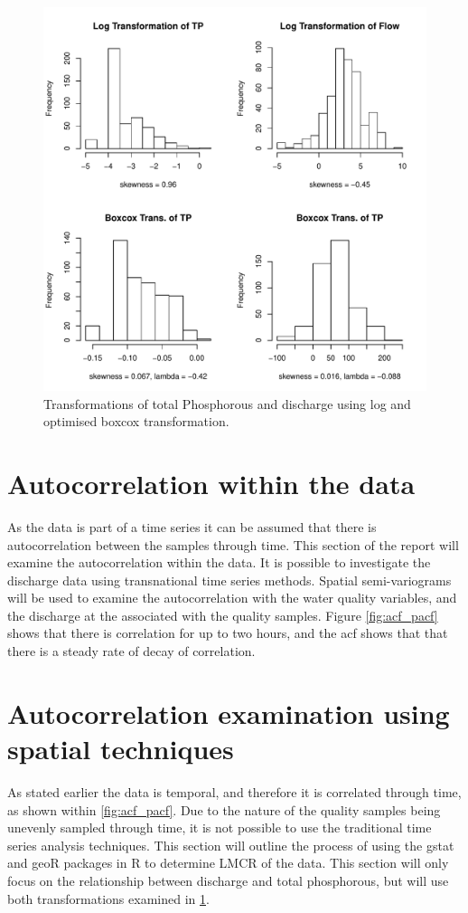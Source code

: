 \documentclass[5p]{elsarticle}
\begin{document}
\begin{center}
\begin{figure}
\includegraphics[scale=0.45]{tp_flow_trans.pdf}
\caption{Transformations of total Phosphorous and discharge using log and optimised boxcox transformation.}
\label{fig:transformations}
\end{figure}
\end{center}

\section*{Autocorrelation within the data}
As the data is part of a time series it can be assumed that there is autocorrelation between the samples through time. This section of the report will examine the autocorrelation within the data. It is possible to investigate the discharge data using transnational time series methods. Spatial semi-variograms will be used to examine the autocorrelation with the water quality variables, and the discharge at the associated with the quality samples. Figure \ref{fig:acf_pacf} shows that there is correlation for up to two hours, and the acf shows that that there is a steady rate of decay of correlation. 

\section*{Autocorrelation examination using spatial techniques}
As stated earlier the data is temporal, and therefore it is correlated through time, as shown within \ref{fig:acf_pacf}. Due to the nature of the quality samples being unevenly sampled through time, it is not possible to use the traditional time series analysis techniques. This section will outline the process of using the gstat and geoR packages in R to determine LMCR of the data. This section will only focus on the relationship between discharge and total phosphorous, but will use both transformations examined in \ref{fig:transformations}.
\end{document}
